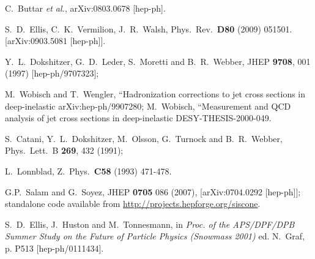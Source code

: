 \documentclass[12pt,a4]{article}
\begin{document}
\begin{thebibliography}{99}
  C.~Buttar {\it et al.},
  arXiv:0803.0678 [hep-ph].

  S.~D.~Ellis, C.~K.~Vermilion, J.~R.~Walsh,
  Phys.\ Rev.\  {\bf D80 } (2009)  051501.
  [arXiv:0903.5081 [hep-ph]].


  Y.~L.~Dokshitzer, G.~D.~Leder, S.~Moretti and B.~R.~Webber,
  JHEP {\bf 9708}, 001 (1997)
  [hep-ph/9707323];

  M.~Wobisch and T.~Wengler,
   ``Hadronization corrections to jet cross sections in deep-inelastic
  arXiv:hep-ph/9907280;
  M.~Wobisch,
   ``Measurement and QCD analysis of jet cross sections in deep-inelastic
DESY-THESIS-2000-049.

  S.~Catani, Y.~L.~Dokshitzer, M.~Olsson, G.~Turnock and B.~R.~Webber,
  Phys.\ Lett.\ B {\bf 269}, 432 (1991);

  L.~Lonnblad,
  Z.\ Phys.\  {\bf C58 } (1993)  471-478.


  G.P.~Salam and G.~Soyez,
  JHEP {\bf 0705} 086 (2007),
  [arXiv:0704.0292 [hep-ph]]; 
standalone code available from \url{http://projects.hepforge.org/siscone}.


  S.~D.~Ellis, J.~Huston and M.~Tonnesmann,
in {\it Proc. of the APS/DPF/DPB Summer Study on the Future of
  Particle Physics (Snowmass 2001) } ed. N.~Graf, p. P513
  [hep-ph/0111434].


\end{thebibliography}
\end{document}
